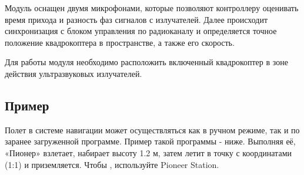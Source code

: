 \documentclass[a4paper,10pt,russian]{sphinxmanual}
\begin{document}
Модуль оснащен двумя микрофонами, которые позволяют контроллеру оценивать время прихода и разность фаз сигналов с излучателей. Далее происходит синхронизация с блоком управления по радиоканалу и определяется точное положение квадрокоптера в пространстве, а также его скорость.

Для работы модуля необходимо расположить включенный квадрокоптер в зоне действия ультразвуковых излучателей.

 {\hyperref[\detokenize{indoor_nav::doc}]{}}


\subsection{Пример}
\label{\detokenize{module/indoor_nav:id2}}
Полет в системе навигации может осуществляться как в ручном режиме, так и по заранее загруженной программе. Пример такой программы - ниже. Выполняя её, «Пионер» взлетает, набирает высоту 1.2 м, затем летит в точку с координатами (1:1) и приземляется. Чтобы , используйте Pioneer Station.
\end{document}
